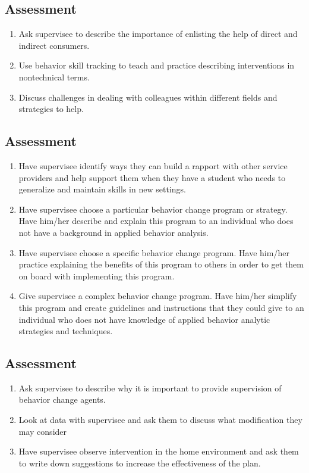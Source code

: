 \subsection{Assessment}
\begin{enumerate}
\item Ask supervisee to describe the importance of enlisting the help of direct and indirect consumers.
\item Use behavior skill tracking to teach and practice describing interventions in nontechnical terms.
\item Discuss challenges in dealing with colleagues within different fields and strategies to help.
\end{enumerate}
%
\subsection{Assessment}
\begin{enumerate}
\item Have supervisee identify ways they can build a rapport with other service providers and help support them when they have a student who needs to generalize and maintain skills in new settings.
\item Have supervisee choose a particular behavior change program or strategy. Have him/her describe and explain this program to an individual who does not have a background in applied behavior analysis. 
\item Have supervisee choose a specific behavior change program. Have him/her practice explaining the benefits of this program to others in order to get them on board with implementing this program.
\item Give supervisee a complex behavior change program. Have him/her simplify this program and create guidelines and instructions that they could give to an individual who does not have knowledge of applied behavior analytic strategies and techniques. 
\end{enumerate}
%
\subsection{Assessment}
\begin{enumerate}
\item Ask supervisee to describe why it is important to provide supervision of behavior change agents.
\item Look at data with supervisee and ask them to discuss what modification they may consider
\item Have supervisee observe intervention in the home environment and ask them to write down suggestions to increase the effectiveness of the plan.
%
\end{enumerate}
%
